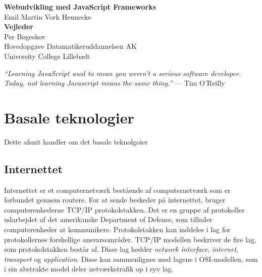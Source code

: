 \documentclass[]{article}
\author{}
\date{\vspace{-2.5em}}
\renewcommand{\contentsname}{Indhold}
\begin{document}
\onehalfspacing
{}

\begin{center}
\vspace*{8\baselineskip}
\LARGE{\textbf{Webudvikling med JavaScript Frameworks}}\\
\vspace*{1\baselineskip}
\Large{Emil Martin Vork Heunecke}\\
\vspace*{3\baselineskip}
\Large{\textbf{Vejleder}}\\
Per Bøgeskov\\
\vspace*{2\baselineskip}
Hovedopgave Datamatikeruddannelsen AK\\
University College Lillebælt\\
\end{center}

\doublespacing

\hypersetup{linkcolor = black}
\newpage
{}
\tableofcontents
\addcontentsline{toc}{section}{\contentsname}

\newpage

\listoffigures 

\newpage
\listoftables

\doublespacing

\newpage
{}
\hypersetup{linkcolor = blue}

\emph{``Learning JavaScript used to mean you weren't a serious software
developer. Today, not learning Javascript means the same thing.''} ---
Tim O'Reilly

\newpage

\hypertarget{basale-teknologier}{%
\section{Basale teknologier}\label{basale-teknologier}}

Dette afsnit handler om det basale teknolgoier

\hypertarget{internettet}{%
\subsection{Internettet}\label{internettet}}

Internettet er et computernetværk bestående af computernetværk som er
forbundet gennem routere. For at sende beskeder på internettet, bruger
computerenhederne TCP/IP protokolstakken. Det er en gruppe af
protokoller udarbejdet af det amerikanske Department of Defense, som
tillader computerenheder at kommunikere. Protokolstakken kan inddeles i
lag for protokollernes forskellige ansvarsområder. TCP/IP modellen
beskriver de fire lag, som protokolstakken består af. Disse lag hedder
\emph{network interface}, \emph{internet}, \emph{transport} og
\emph{application}. Disse kan sammenlignes med lagene i OSI-modellen,
som i sin abstrakte model deler netværkstrafik op i syv lag.
\end{document}
